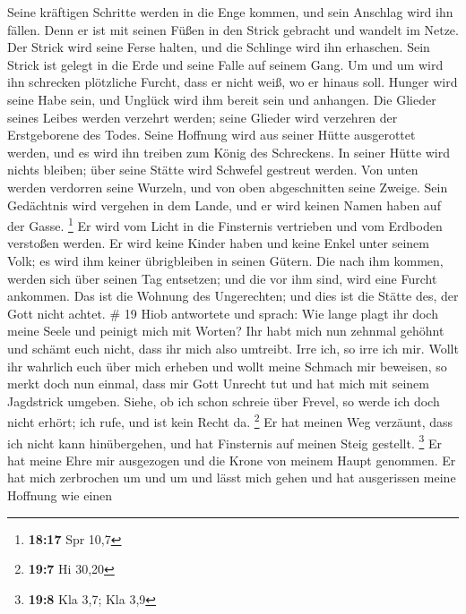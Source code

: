  Seine kräftigen Schritte werden in die Enge kommen, und
sein Anschlag wird ihn fällen.  Denn er ist mit seinen
Füßen in den Strick gebracht und wandelt im Netze.  Der
Strick wird seine Ferse halten, und die Schlinge wird ihn erhaschen.
 Sein Strick ist gelegt in die Erde und seine Falle auf
seinem Gang.  Um und um wird ihn schrecken plötzliche
Furcht, dass er nicht weiß, wo er hinaus soll.  Hunger
wird seine Habe sein, und Unglück wird ihm bereit sein und anhangen.
 Die Glieder seines Leibes werden verzehrt werden; seine
Glieder wird verzehren der Erstgeborene des Todes.  Seine
Hoffnung wird aus seiner Hütte ausgerottet werden, und es wird ihn
treiben zum König des Schreckens.  In seiner Hütte wird
nichts bleiben; über seine Stätte wird Schwefel gestreut werden.
 Von unten werden verdorren seine Wurzeln, und von oben
abgeschnitten seine Zweige.  Sein Gedächtnis wird
vergehen in dem Lande, und er wird keinen Namen haben auf der Gasse.
\footnote{\textbf{18:17} Spr 10,7}  Er wird vom Licht in
die Finsternis vertrieben und vom Erdboden verstoßen werden.
 Er wird keine Kinder haben und keine Enkel unter seinem
Volk; es wird ihm keiner übrigbleiben in seinen Gütern. 
Die nach ihm kommen, werden sich über seinen Tag entsetzen; und die vor
ihm sind, wird eine Furcht ankommen.  Das ist die Wohnung
des Ungerechten; und dies ist die Stätte des, der Gott nicht achtet. \#
19  Hiob antwortete und sprach:  Wie lange
plagt ihr doch meine Seele und peinigt mich mit Worten? 
Ihr habt mich nun zehnmal gehöhnt und schämt euch nicht, dass ihr mich
also umtreibt.  Irre ich, so irre ich mir. 
Wollt ihr wahrlich euch über mich erheben und wollt meine Schmach mir
beweisen,  so merkt doch nun einmal, dass mir Gott Unrecht
tut und hat mich mit seinem Jagdstrick umgeben.  Siehe, ob
ich schon schreie über Frevel, so werde ich doch nicht erhört; ich rufe,
und ist kein Recht da. \footnote{\textbf{19:7} Hi 30,20} 
Er hat meinen Weg verzäunt, dass ich nicht kann hinübergehen, und hat
Finsternis auf meinen Steig gestellt. \footnote{\textbf{19:8} Kla 3,7;
  Kla 3,9}  Er hat meine Ehre mir ausgezogen und die Krone
von meinem Haupt genommen.  Er hat mich zerbrochen um und
um und lässt mich gehen und hat ausgerissen meine Hoffnung wie einen
